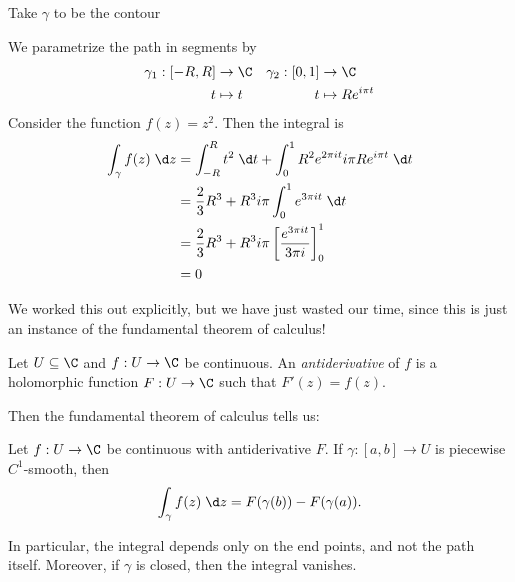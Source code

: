\documentclass[a4paper]{article}
\begin{document}
\begin{eg}
  Take $\gamma$ to be the contour
  \begin{center}
  \end{center}
  We parametrize the path in segments by
  \begin{align*}
    \gamma_1: [-R, R] &\to \C & \gamma_2: [0, 1] &\to \C\\
    t &\mapsto t & t &\mapsto R e^{i\pi t}
  \end{align*}
  Consider the function $f(z) = z^2$. Then the integral is
  \begin{align*}
    \int_\gamma f(z)\;\d z &= \int_{-R}^R t^2 \;\d t + \int_0^1 R^2 e^{2\pi i t} i\pi R e^{i\pi t}\;\d t\\
    &= \frac{2}{3}R^3 + R^3 i\pi \int_0^1 e^{3 \pi i t}\;\d t\\
    &= \frac{2}{3}R^3 + R^3 i\pi \left[\frac{e^{3\pi it}}{3\pi i}\right]_0^1\\
    &= 0
  \end{align*}
\end{eg}
We worked this out explicitly, but we have just wasted our time, since this is just an instance of the fundamental theorem of calculus!

\begin{defi}[Antiderivative]
  Let $U \subseteq \C$ and $f: U \to \C$ be continuous. An \emph{antiderivative} of $f$ is a holomorphic function $F: U \to \C$ such that $F'(z) = f(z)$.
\end{defi}

Then the fundamental theorem of calculus tells us:
\begin{thm}
  Let $f: U \to \C$ be continuous with antiderivative $F$. If $\gamma: [a, b] \to U$ is piecewise $C^1$-smooth, then
  \[
    \int_\gamma f(z)\;\d z= F(\gamma(b)) - F(\gamma(a)).
  \]
\end{thm}
In particular, the integral depends only on the end points, and not the path itself. Moreover, if $\gamma$ is closed, then the integral vanishes.
\end{document}
